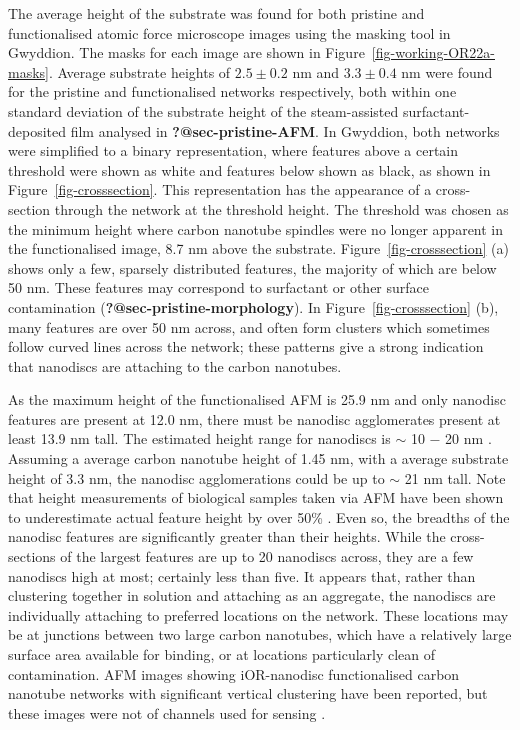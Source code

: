 \documentclass[
  a4paper,
]{scrbook}
\begin{document}
The average height of the substrate was found for both pristine and
functionalised atomic force microscope images using the masking tool in
Gwyddion. The masks for each image are shown in
Figure~\ref{fig-working-OR22a-masks}. Average substrate heights of
\(2.5\pm0.2\) nm and \(3.3\pm0.4\) nm were found for the pristine and
functionalised networks respectively, both within one standard deviation
of the substrate height of the steam-assisted surfactant-deposited film
analysed in \textbf{?@sec-pristine-AFM}. In Gwyddion, both networks were
simplified to a binary representation, where features above a certain
threshold were shown as white and features below shown as black, as
shown in Figure~\ref{fig-crosssection}. This representation has the
appearance of a cross-section through the network at the threshold
height. The threshold was chosen as the minimum height where carbon
nanotube spindles were no longer apparent in the functionalised image,
8.7 nm above the substrate. Figure~\ref{fig-crosssection} (a) shows only
a few, sparsely distributed features, the majority of which are below 50
nm. These features may correspond to surfactant or other surface
contamination (\textbf{?@sec-pristine-morphology}). In
Figure~\ref{fig-crosssection} (b), many features are over 50 nm across,
and often form clusters which sometimes follow curved lines across the
network; these patterns give a strong indication that nanodiscs are
attaching to the carbon nanotubes.

As the maximum height of the functionalised AFM is 25.9 nm and only
nanodisc features are present at 12.0 nm, there must be nanodisc
agglomerates present at least 13.9 nm tall. The estimated height range
for nanodiscs is \(\sim\) 10 \(-\) 20 nm
\autocite{Nath2007,Bayburt2010,Murugathas2020}. Assuming a average
carbon nanotube height of 1.45 nm, with a average substrate height of
3.3 nm, the nanodisc agglomerations could be up to \(\sim\) 21 nm tall.
Note that height measurements of biological samples taken via AFM have
been shown to underestimate actual feature height by over 50\%
\autocite{Vobornik2023}. Even so, the breadths of the nanodisc features
are significantly greater than their heights. While the cross-sections
of the largest features are up to 20 nanodiscs across, they are a few
nanodiscs high at most; certainly less than five. It appears that,
rather than clustering together in solution and attaching as an
aggregate, the nanodiscs are individually attaching to preferred
locations on the network. These locations may be at junctions between
two large carbon nanotubes, which have a relatively large surface area
available for binding, or at locations particularly clean of
contamination. AFM images showing iOR-nanodisc functionalised carbon
nanotube networks with significant vertical clustering have been
reported, but these images were not of channels used for sensing
\autocite{Murugathas2019b}.
\end{document}
